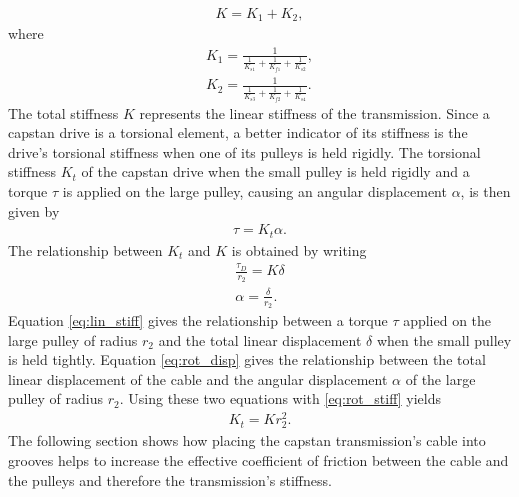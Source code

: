 \documentclass[10pt,cleanfoot]{asme2ej}
\begin{document}
 \begin{align}
     K = K_1 + K_2,
 \end{align}
 where
 \begin{align}
     K_1 = \frac{1}{\frac{1}{K_{s1}}+\frac{1}{K_{f1}}+\frac{1}{K_{s2}}},\\
     K_2 = \frac{1}{\frac{1}{K_{s3}}+\frac{1}{K_{f2}}+\frac{1}{K_{s4}}}.
 \end{align}
 The total stiffness $K$ represents the linear stiffness of the transmission. Since a capstan drive is a torsional element, a better indicator of its stiffness is the drive's torsional stiffness when one of its pulleys is held rigidly. The torsional stiffness $K_t$ of the capstan drive when the small pulley is held rigidly and  a torque $\tau$ is applied on the large pulley, causing an angular displacement $\alpha$, is then given by
 \begin{align}
     \tau = K_t\alpha. \label{eq:rot_stiff}
 \end{align}
 The relationship between $K_t$ and $K$ is obtained by writing
 \begin{align}
    \frac{\tau_D}{r_2} = K\delta \label{eq:lin_stiff}\\
     \alpha = \frac{\delta}{r_2} \label{eq:rot_disp}.
 \end{align}
 Equation \eqref{eq:lin_stiff} gives the relationship between a torque $\tau$ applied on the large pulley  of radius $r_2$ and the total linear displacement $\delta$ when the small pulley is held tightly. Equation \eqref{eq:rot_disp} gives the relationship between the total linear displacement of the cable and the angular displacement $\alpha$ of the large pulley of radius $r_2$. Using these two equations with \eqref{eq:rot_stiff} yields
 \begin{align}
     K_t = Kr_2^2. 
 \end{align}
The following section shows how placing the capstan transmission's cable into grooves helps to increase the effective coefficient of friction between the cable and the pulleys and therefore the transmission's stiffness.
\end{document}

